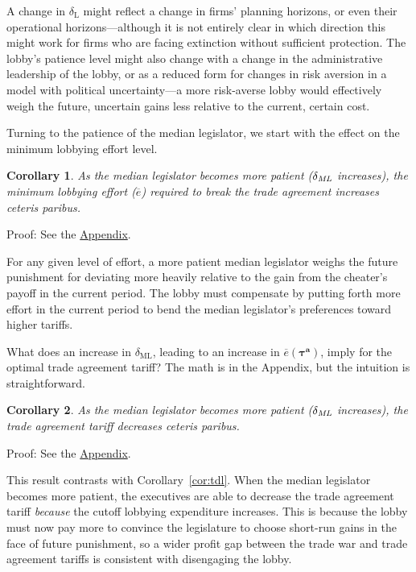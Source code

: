 \documentclass[authoryear, review]{elsarticle}
\newtheorem{corollary}{Corollary}
\newcommand{\ov}{\overline}
\newcommand{\bta}{\bm{\tau^a}}
\newcommand{\de}{\delta}
\begin{document}
A change in $\de_\text{L}$ might reflect a change in firms' planning horizons, or even their operational horizons---although it is not entirely clear in which direction this might work for firms who are facing extinction without sufficient protection. The lobby's patience level might also change with a change in the administrative leadership of the lobby, or as a reduced form for changes in risk aversion in a model with political uncertainty---a more risk-averse lobby would effectively weigh the future, uncertain gains less relative to the current, certain cost.

Turning to the patience of the median legislator, we start with the effect on the minimum lobbying effort level.

\begin{corollary}
  As the median legislator becomes more patient ($\de_\emph{ML}$ increases), the minimum lobbying effort ($\ov{e}$) required to break the trade agreement increases \emph{ceteris paribus}.
  \label{cor:edm}
\end{corollary}
Proof: See the \hyperlink{Cor_edm}{Appendix}.

\noindent For any given level of effort, a more patient median legislator weighs the future punishment for deviating more heavily relative to the gain from the cheater's payoff in the current period. The lobby must compensate by putting forth more effort in the current period to bend the median legislator's preferences toward higher tariffs.

What does an increase in $\de_\text{ML}$, leading to an increase in $\ov{e}(\bta)$, imply for the optimal trade agreement tariff? The math is in the Appendix, but the intuition is straightforward.

\begin{corollary}
  As the median legislator becomes more patient ($\de_\emph{ML}$ increases), the trade agreement tariff decreases \emph{ceteris paribus}.
  \label{cor:tdm}
\end{corollary}
Proof: See the \hyperlink{Cor_tdm}{Appendix}.

\noindent This result contrasts with Corollary~\ref{cor:tdl}. When the median legislator becomes more patient, the executives are able to decrease the trade agreement tariff \textit{because} the cutoff lobbying expenditure increases. This is because the lobby must now pay more to convince the legislature to choose short-run gains in the face of future punishment, so a wider profit gap between the trade war and trade agreement tariffs is consistent with disengaging the lobby.
\end{document}

